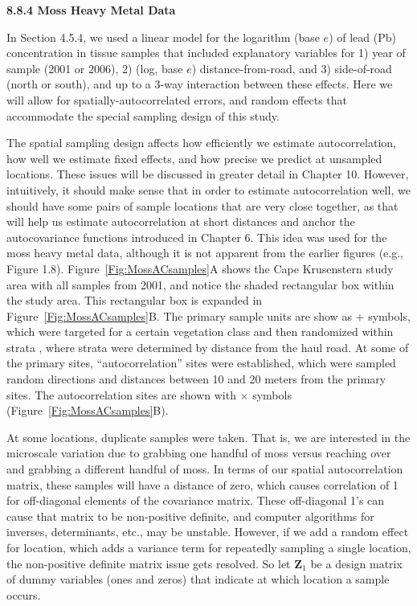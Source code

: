 \documentclass[12pt, titlepage]{article}
\begin{document}
\setcounter{equation}{0}
\renewcommand{\theequation}{R.\arabic{equation}}


%
%

{\large \flushleft \textbf{8.8.4 Moss Heavy Metal Data}}

\vspace{.3cm}

In Section 4.5.4, we used a linear model for the logarithm (base $e$) of lead (Pb) concentration in tissue samples that included explanatory variables for 1) year of sample (2001 or 2006), 2) (log, base $e$) distance-from-road, and 3) side-of-road (north or south), and up to a 3-way interaction between these effects.  Here we will allow for spatially-autocorrelated errors, and random effects that accommodate the special sampling design of this study.  

The spatial sampling design affects how efficiently we estimate autocorrelation, how well we estimate fixed effects, and how precise we predict at unsampled locations.  These issues will be discussed in greater detail in Chapter 10.  However, intuitively, it should make sense that in order to estimate autocorrelation well, we should have some pairs of sample locations that are very close together, as that will help us estimate autocorrelation at short distances and anchor the autocovariance functions introduced in Chapter 6.  This idea was used for the moss heavy metal data, although it is not apparent from the earlier figures (e.g., Figure 1.8).  Figure~\ref{Fig:MossACsamples}A shows the Cape Krusenstern study area with all samples from 2001, and notice the shaded rectangular box within the study area.  This rectangular box is expanded in Figure~\ref{Fig:MossACsamples}B.  The primary sample units are show as $+$ symbols, which were targeted for a certain vegetation class and then randomized within strata , where strata were determined by distance from the haul road.  At some of the primary sites, ``autocorrelation'' sites were established, which were sampled random directions and distances between 10 and 20 meters from the primary sites.  The autocorrelation sites are shown with $\times$ symbols (Figure~\ref{Fig:MossACsamples}B).

At some locations, duplicate samples were taken. That is, we are interested in the microscale variation due to grabbing one handful of moss versus reaching over and grabbing a different handful of moss. In terms of our spatial autocorrelation matrix, these samples will have a distance of zero, which causes correlation of 1 for off-diagonal elements of the covariance matrix.  These off-diagonal 1's can cause that matrix to be non-positive definite, and computer algorithms for inverses, determinants, etc., may be unstable.  However, if we add a random effect for location, which adds a variance term for repeatedly sampling a single location, the non-positive definite matrix issue gets resolved.  So let $\mathbf{Z}_{1}$ be a design matrix of dummy variables (ones and zeros) that indicate at which location a sample occurs. 
\end{document}

